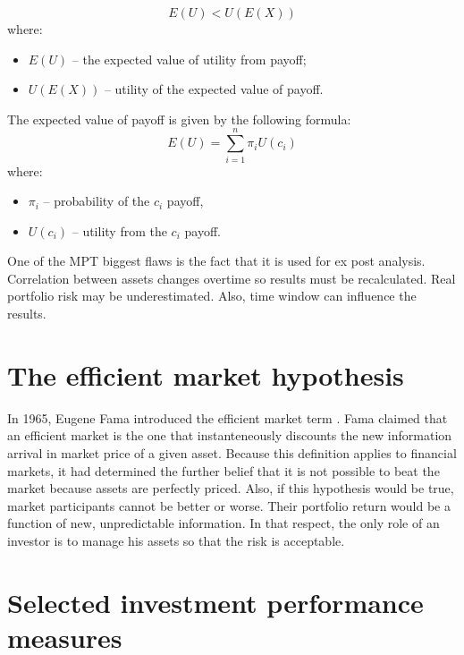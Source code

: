 \documentclass{pracamgr_wne}\usepackage[]{graphicx}\usepackage[]{color}
\begin{document}
\begin{equation}
E(U)<U(E(X))
\end{equation}
where:
\begin{itemize}
\item $E(U)$ -- the expected value of utility from payoff;
\item $U(E(X))$ -- utility of the expected value of payoff.
\end{itemize}
The expected value of payoff is given by the following formula:
\begin{equation}
E(U)=\sum_{i=1}^{n}\pi_iU(c_i)
\end{equation}
where:
\begin{itemize}
\item $\pi_i$ -- probability of the $c_i$ payoff,
\item $U(c_i)$ -- utility from the $c_i$ payoff.
\end{itemize}
One of the MPT biggest flaws is the fact that it is used for ex post analysis. Correlation between assets changes overtime so results must be recalculated. Real portfolio risk may be underestimated. Also, time window can influence the results.

\section{The efficient market hypothesis}

In 1965, Eugene Fama introduced the efficient market term \parencite{Fama1965}. Fama claimed that an efficient market is the one that instanteneously discounts the new information arrival in market price of a given asset. Because this definition applies to financial markets, it had determined the further belief that it is not possible to beat the market because assets are perfectly priced. Also, if this hypothesis would be true, market participants cannot be better or worse. Their portfolio return would be a function of new, unpredictable information. In that respect, the only role of an investor is to manage his assets so that the risk is acceptable. 





\section{Selected investment performance measures}
\end{document}
